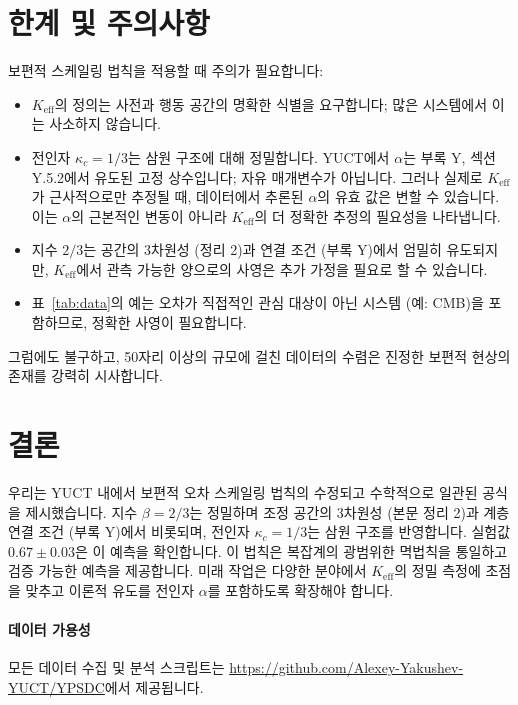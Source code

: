 \documentclass[11pt,a4paper]{article}
\newcommand{\Keff}{K_{\mathrm{eff}}}
\newcommand{\kappac}{\kappa_c}
\begin{document}
	\section{한계 및 주의사항}
	\label{sec:limitations}
	
	보편적 스케일링 법칙을 적용할 때 주의가 필요합니다:
	\begin{itemize}
		\item \(\Keff\)의 정의는 사전과 행동 공간의 명확한 식별을 요구합니다; 많은 시스템에서 이는 사소하지 않습니다.
		\item 전인자 \(\kappac = 1/3\)는 삼원 구조에 대해 정밀합니다. YUCT에서 \(\alpha\)는 부록 Y, 섹션 Y.5.2에서 유도된 고정 상수입니다; 자유 매개변수가 아닙니다. 그러나 실제로 \(\Keff\)가 근사적으로만 추정될 때, 데이터에서 추론된 \(\alpha\)의 유효 값은 변할 수 있습니다. 이는 \(\alpha\)의 근본적인 변동이 아니라 \(\Keff\)의 더 정확한 추정의 필요성을 나타냅니다.
		\item 지수 \(2/3\)는 공간의 3차원성 (정리 2)과 연결 조건 (부록 Y)에서 엄밀히 유도되지만, \(\Keff\)에서 관측 가능한 양으로의 사영은 추가 가정을 필요로 할 수 있습니다.
		\item 표~\ref{tab:data}의 예는 오차가 직접적인 관심 대상이 아닌 시스템 (예: CMB)을 포함하므로, 정확한 사영이 필요합니다.
	\end{itemize}
	
	그럼에도 불구하고, 50자리 이상의 규모에 걸친 데이터의 수렴은 진정한 보편적 현상의 존재를 강력히 시사합니다.
	
	\section{결론}
	우리는 YUCT 내에서 보편적 오차 스케일링 법칙의 수정되고 수학적으로 일관된 공식을 제시했습니다. 지수 \(\beta = 2/3\)는 정밀하며 조정 공간의 3차원성 (본문 정리 2)과 계층 연결 조건 (부록 Y)에서 비롯되며, 전인자 \(\kappac = 1/3\)는 삼원 구조를 반영합니다. 실험값 \(0.67 \pm 0.03\)은 이 예측을 확인합니다. 이 법칙은 복잡계의 광범위한 멱법칙을 통일하고 검증 가능한 예측을 제공합니다. 미래 작업은 다양한 분야에서 \(\Keff\)의 정밀 측정에 초점을 맞추고 이론적 유도를 전인자 \(\alpha\)를 포함하도록 확장해야 합니다.
	
	\paragraph*{데이터 가용성}
	모든 데이터 수집 및 분석 스크립트는 \url{https://github.com/Alexey-Yakushev-YUCT/YPSDC}에서 제공됩니다.
	
\end{document}
